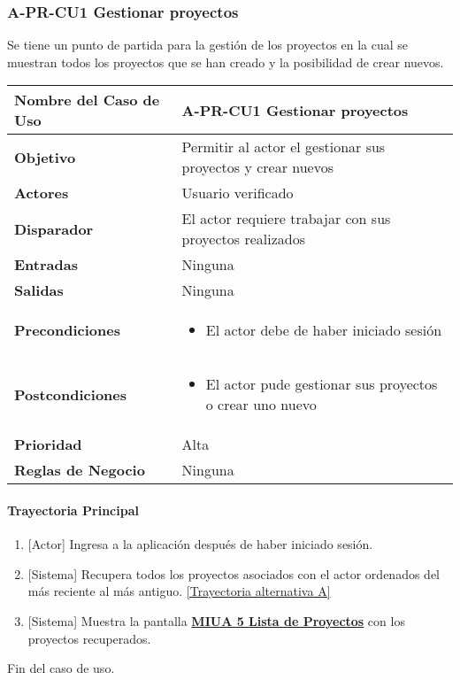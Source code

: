 \subsubsection{A-PR-CU1 Gestionar proyectos}
Se tiene un punto de partida para la gestión de los proyectos en la cual se muestran todos los proyectos que se han creado y la posibilidad de crear nuevos.
\begin{longtable}{|J{5cm}|J{10.3cm}|}
	\hline
	\textbf{Nombre del Caso de Uso} &
		A-PR-CU1 Gestionar proyectos \\ \hline
	\textbf{Objetivo} &
		Permitir al actor el gestionar sus proyectos y crear nuevos \\ \hline
	\textbf{Actores} &
		Usuario verificado \\ \hline 
	\textbf{Disparador} & 
		El actor requiere trabajar con sus proyectos realizados \\ \hline 
	\textbf{Entradas} & 
		Ninguna \\ \hline 
	\textbf{Salidas} & 
		Ninguna \\ \hline
	\textbf{Precondiciones} &
		\begin{itemize}
				\item El actor debe de haber iniciado sesión
		\end{itemize} \\ \hline
	\textbf{Postcondiciones} &
		\begin{itemize}
			\item El actor pude gestionar sus proyectos o crear uno nuevo
		\end{itemize}\\ \hline
	\textbf{Prioridad} & 
		Alta \\ \hline
	\textbf{Reglas de Negocio} & 
		Ninguna \\ \hline

\end{longtable}
\paragraph{Trayectoria Principal}
	\begin{enumerate}
	    \item {[Actor]} Ingresa a la aplicación después de haber iniciado sesión.
	    \item {[Sistema]} Recupera todos los proyectos asociados con el actor ordenados del más reciente al más antiguo. \hyperref[A-PR-CU1:TA]{[Trayectoria alternativa A]}
	    \item {[Sistema]} Muestra la pantalla \hyperref[fig:MIUA-5]{\bf MIUA 5 Lista de Proyectos} con los proyectos recuperados.
	\end{enumerate}
	Fin del caso de uso.

